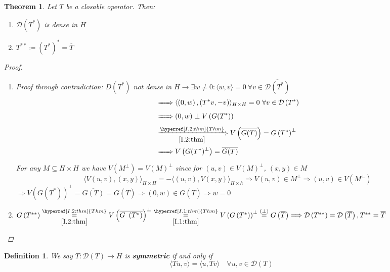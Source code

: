 \documentclass[12pt]{extreport} %
\newcommand{\DO}[1]{\mathcal{D}\left( {#1} \right)}
\theoremstyle{named}
\theoremstyle{nnamed}
\theoremstyle{itshape}
\newtheorem{definition}{Definition}  \counterwithin{definition}{chapter}
\newtheorem{theorem}{Theorem}  \counterwithin{theorem}{chapter}
\theoremstyle{normal}
\begin{document}
\begin{theorem} \label{I.3:thm}
	Let $T$ be a closable operator. Then:
	\begin{enumerate}
		\item $\DO{T^*}$ is dense in $H$
		\item $T^{**} \coloneqq \left( T^* \right)^* = \overline{T}$
	\end{enumerate} 
	
	\begin{proof} ~\
		\begin{enumerate}
			\item Proof through contradiction: $D\left( T^* \right)$ not dense in $H \rightarrow \exists w \neq 0: \langle w, v \rangle = 0 ~\forall v \in \overline{\DO{T^*}}$
				\begin{align*}
					& \xRightarrow[]{~~~~} \langle \left( 0, w \right), \left( T^*v, -v \right) \rangle_{H \times H} = 0 ~\forall v \in \DO{T^*} \\
					& \xRightarrow[]{~~~~} \left( 0, w \right) \perp V \left( G(T^*) \right) \\
					& \xRightarrow[\ref{I.2:thm}]{\hyperref[I.2:thm]{Thm}} V \left( \overline{G(T)} \right) = G \left( T^* \right)^{\perp} \\
					& \xRightarrow[]{~~~~} V \left( G(T^*)^{\perp} \right) = \overline{G(T)}
				\end{align*}
				For any $M \subseteq H \times H$ we have $V \left( M^{\perp} \right) = V(M)^{\perp}$ since for $(u,v) \in V(M)^{\perp}$, $(x,y) \in M$
				$$ \langle V(u, v) , (x,y) \rangle_{H \times H} = - \langle (u, v ), V(x,y) \rangle_{H \times h} \Rightarrow V(u, v) \in M^{\perp} \Rightarrow (u, v) \in V\left( M^{\perp} \right) $$
				$\Longrightarrow V \left( G \left( T^* \right) \right)^{\perp} = \overline{G(T)} = G \left(\overline{T} \right) \Longrightarrow (0, w) \in G\left( \overline{T} \right) \Longrightarrow w = 0$
			\item $G \left( T^{**} \right) \overset{\hyperref[I.2:thm]{Thm}}{\underset{\ref{I.2:thm}}{=}} V \left( \overline{G \left( T^* \right)} \right)^{\perp} \overset{\hyperref[I.1:thm]{Thm}}{\underset{\ref{I.1:thm}}{=}} V \left( G \left( T^* \right) \right)^{\perp} \overset{(\perp)}{=} G \left( \overline{T} \right) \Longrightarrow \DO{T^{**}} = \DO{\overline{T}}, T^{**} = \overline{T}$
		\end{enumerate}
	\end{proof}
\end{theorem}

\begin{definition}
	We say $T \colon \DO{T} \rightarrow H$ is \textbf{symmetric} if and only if
	$$ \langle Tu, v \rangle = \langle u , Tv \rangle \quad \forall u, v \in \DO{T} $$
\end{definition}
\end{document}
